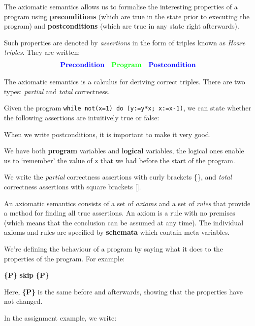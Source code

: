 \documentclass[11pt,a4paper,titlepage,dvipsnames,cmyk]{scrartcl}
\begin{document}
The axiomatic semantics allows us to formalise the interesting properties
of a program using \textbf{preconditions} (which are true in the state
prior to executing the program) and \textbf{postconditions} (which are
true in any state right afterwards).

Such properties are denoted by \textit{assertions} in the form of triples
known as \textit{Hoare triples}. They are written:
\begin{align*}
    {\color{blue} \textbf{Precondition}} \quad {\color{green}
    \textbf{Program}} \quad {\color{blue} \textbf{Postcondition}}
\end{align*}

The axiomatic semantics is a calculus for deriving correct triples. There
are two types: \textit{partial} and \textit{total} correctness.

Given the program \lstinline|while not(x=1) do (y:=y*x; x:=x-1)|, we can
state whether the following assertions are intuitively true or false:


When we write postconditions, it is important to make it very good.

We have both \textbf{program} variables and \textbf{logical} variables,
the logical ones enable us to `remember' the value of \lstinline|x| that
we had before the start of the program.

We write the \textit{partial} correctness assertions with curly brackets
\{\}, and \textit{total} correctness assertions with square brackets [].

An axiomatic semantics consists of a set of \textit{axioms} and a set of
\textit{rules} that provide a method for finding all true assertions. An
axiom is a rule with no premises (which means that the conclusion can be
assumed at any time). The individual axioms and rules are specified by
\textbf{schemata} which contain meta variables.

We're defining the behaviour of a program by saying what it does to the
properties of the program. For example:

\begin{center}
    {\color{blue}\textbf{\{P\}}} {\color{green}\textbf{skip}}
    {\color{blue}\textbf{\{P\}}}
\end{center}

Here, {\color{blue}\textbf{\{P\}}} is the same before and afterwards,
showing that the properties have not changed.

In the assignment example, we write:
\end{document}
